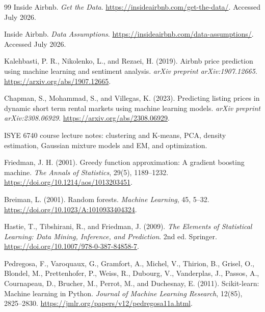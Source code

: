 \documentclass[11pt]{article}
\begin{document}
\begin{thebibliography}{99}
Inside Airbnb. \textit{Get the Data}. \url{https://insideairbnb.com/get-the-data/}. Accessed July 2026.

Inside Airbnb. \textit{Data Assumptions}. \url{https://insideairbnb.com/data-assumptions/}. Accessed July 2026.

Kalehbasti, P. R., Nikolenko, L., and Rezaei, H. (2019). Airbnb price prediction using machine learning and sentiment analysis. \textit{arXiv preprint arXiv:1907.12665}. \url{https://arxiv.org/abs/1907.12665}.

Chapman, S., Mohammad, S., and Villegas, K. (2023). Predicting listing prices in dynamic short term rental markets using machine learning models. \textit{arXiv preprint arXiv:2308.06929}. \url{https://arxiv.org/abs/2308.06929}.

ISYE 6740 course lecture notes: clustering and K-means, PCA, density estimation, Gaussian mixture models and EM, and optimization.

Friedman, J. H. (2001). Greedy function approximation: A gradient boosting machine. \textit{The Annals of Statistics}, 29(5), 1189--1232. \url{https://doi.org/10.1214/aos/1013203451}.

Breiman, L. (2001). Random forests. \textit{Machine Learning}, 45, 5--32. \url{https://doi.org/10.1023/A:1010933404324}.

Hastie, T., Tibshirani, R., and Friedman, J. (2009). \textit{The Elements of Statistical Learning: Data Mining, Inference, and Prediction}. 2nd ed. Springer. \url{https://doi.org/10.1007/978-0-387-84858-7}.

Pedregosa, F., Varoquaux, G., Gramfort, A., Michel, V., Thirion, B., Grisel, O., Blondel, M., Prettenhofer, P., Weiss, R., Dubourg, V., Vanderplas, J., Passos, A., Cournapeau, D., Brucher, M., Perrot, M., and Duchesnay, E. (2011). Scikit-learn: Machine learning in Python. \textit{Journal of Machine Learning Research}, 12(85), 2825--2830. \url{https://jmlr.org/papers/v12/pedregosa11a.html}.
\end{thebibliography}
\end{document}

